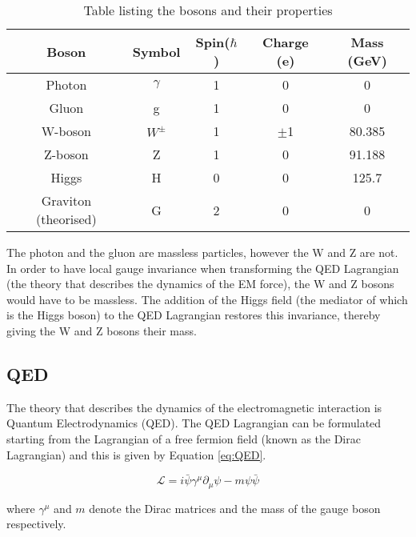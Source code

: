 \documentclass[11pt,oneside,a4paper]{article}
\begin{document}
\begin{table}[h!]
	\begin{center}
		\begin{tabular}{|| c | c| c |c |c||} 
			\hline
			Boson & Symbol & Spin($\hbar$) & Charge (e) &  Mass (GeV) \\ [0.5ex] 
			\hline\hline
			Photon & $\gamma$ & 1 & 0 & 0  \\ 
			Gluon & g & 1  & 0 & 0 \\
			 W-boson & $W^{\pm}$ & 1 & $\pm$1 & 80.385 \\
			Z-boson & Z & 1 & 0 & 91.188\\
			Higgs & H & 0 & 0 & 125.7 \\ 
			Graviton (theorised) & G & 2 & 0 & 0 \\ [1 ex] 
			\hline
		\end{tabular}
		\caption{Table listing the bosons and their properties}
		\label{table:bosons}
	\end{center}
\end{table}

The photon and the gluon are massless particles, however the W and Z are not. In order to have local gauge invariance when transforming the QED Lagrangian (the theory that describes the dynamics of the EM force), the W and Z bosons would have to be massless. The addition of the Higgs field (the mediator of which is the Higgs boson) to the QED Lagrangian restores this invariance, thereby giving the W and Z bosons their mass.

\subsection{QED}
The theory that describes the dynamics of the electromagnetic interaction is Quantum Electrodynamics (QED). The QED Lagrangian can be formulated starting from the Lagrangian of a free fermion field (known as the Dirac Lagrangian) and this is given by Equation \ref{eq:QED}.

\begin{equation}
\label{eq:QED}
\mathcal{L} = i\bar{\psi} \gamma^{\mu} \partial_{\mu} \psi - m \psi \bar{\psi}
\end{equation}

where $\gamma^{\mu}$ and $m$ denote the Dirac matrices and the mass of the gauge boson respectively.
\end{document}
